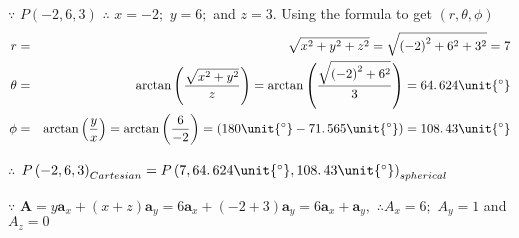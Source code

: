 \documentclass{article}
\begin{document}
$\because $ $P\left( -2,6,3\right) $ $\therefore $ $x=-2;$ $y=6;$ and $z=3$.
Using the formula to get $\left( r,\theta ,\phi \right) $ 
\begin{eqnarray*}
r &=&\sqrt{x^{2}+y^{2}+z^{2}}=\sqrt{\left( -2\right) ^{2}+6^{2}+3^{2}}=7 \\
\theta &=&\arctan \left( \dfrac{\sqrt{x^{2}+y^{2}}}{z}\right) =\arctan
\left( \dfrac{\sqrt{\left( -2\right) ^{2}+6^{2}}}{3}\right)
=64.\,\allowbreak 624\unit{%
{{}^\circ}%
} \\
\phi &=&\arctan \left( \dfrac{y}{x}\right) =\arctan \left( \dfrac{6}{-2}%
\right) =\left( 180\unit{%
{{}^\circ}%
}-71.\,\allowbreak 565\unit{%
{{}^\circ}%
}\right) =108.\,\allowbreak 43\unit{%
{{}^\circ}%
}
\end{eqnarray*}

$\therefore $ $P\left( -2,6,3\right) _{Cartesian}=P\left( 7,64.\,\allowbreak
624\unit{%
{{}^\circ}%
},108.\,\allowbreak 43\unit{%
{{}^\circ}%
}\right) _{spherical}$

$\because $ $\mathbf{A=}y\mathbf{a}_{x}+\left( x+z\right) \mathbf{a}_{y}=6%
\mathbf{a}_{x}+\left( -2+3\right) \mathbf{a}_{y}=\allowbreak 6\mathbf{a}_{x}+%
\mathbf{a}_{y},$ $\therefore A_{x}=6;$ $A_{y}=1$ and $A_{z}=0$
\end{document}
